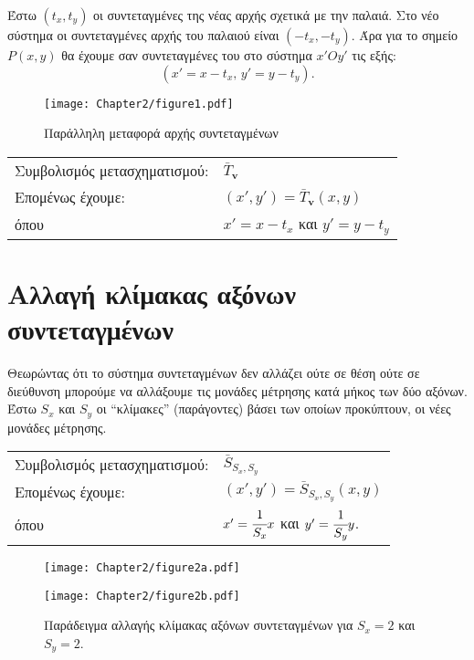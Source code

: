 Έστω \((t_x, t_y)\) οι συντεταγμένες της νέας αρχής σχετικά με την παλαιά. Στο νέο σύστημα οι συντεταγμένες αρχής του παλαιού είναι \((-t_x, -t_y)\). Άρα για το σημείο \(P(x, y)\) θα έχουμε σαν συντεταγμένες του στο σύστημα \(x'Oy'\) τις εξής:
%
\[
(x' = x - t_x, \, y' = y - t_y).
\]

\begin{figure}[hbt]
  \begin{center}
	\texttt{[image: Chapter2/figure1.pdf]}
  \end{center}
  \caption{Παράλληλη μεταφορά αρχής συντεταγμένων}
\end{figure}








\begin{tabular}{m{}m{}}
	Συμβολισμός μετασχηματισμού: & $ \bar{T}_\mathbf{v} $\\
	Επομένως έχουμε: & $(x', y') = \bar{T}_\mathbf{v}(x, y)$\\
	όπου & $x' = x - t_x$ και $y' = y - t_y$
\end{tabular}


\section{Αλλαγή κλίμακας αξόνων συντεταγμένων}

Θεωρώντας ότι το σύστημα συντεταγμένων δεν αλλάζει ούτε σε θέση ούτε σε διεύθυνση μπορούμε να αλλάξουμε τις μονάδες μέτρησης κατά μήκος των δύο αξόνων. Έστω $S_x$ και $S_y$ οι ``κλίμακες'' (παράγοντες) βάσει των οποίων προκύπτουν, οι νέες μονάδες μέτρησης.
 
 
\begin{tabular}{m{}m{}}
	Συμβολισμός μετασχηματισμού: & $ \bar{S}_{S_x, S_y}$\\
	Επομένως έχουμε: & $(x', y') = \bar{S}_{S_x, S_y}(x, y)$\\
	όπου & $x' = \cfrac{1}{S_x} x$ και $y' = \cfrac{1}{S_y} y$.
\end{tabular}


\begin{figure}[h!]
\begin{center}
	\begin{minipage}[b]{0.48\textwidth} %
	    \texttt{[image: Chapter2/figure2a.pdf]}
	\end{minipage}%
	\hfill
	\begin{minipage}[b]{0.48\textwidth} %
	    \texttt{[image: Chapter2/figure2b.pdf]}
	\end{minipage}
\end{center}
  \caption{Παράδειγμα αλλαγής κλίμακας αξόνων συντεταγμένων για $S_x = 2$ και $S_y = 2$.}
\end{figure}


